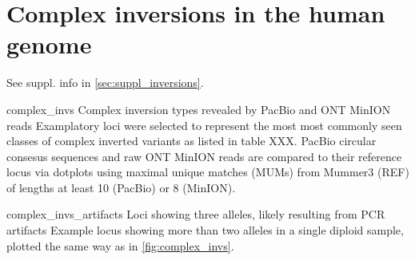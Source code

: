 \chapter{Complex inversions in the human genome}
\label{sec:inversions}

See suppl. info in \cref{sec:suppl_inversions}.

    {complex_invs}
    {Complex inversion types revealed by PacBio and ONT MinION reads}
    {Examplatory loci were selected to represent the most most commonly seen
    classes of complex inverted variants as listed in table XXX. PacBio circular
    consesus sequences and raw ONT MinION reads are compared to their reference
    locus via dotplots using maximal unique matches (MUMs) from Mummer3 (REF) of
    lengths at least 10 (PacBio) or 8 (MinION).}

    {complex_invs_artifacts}
    {Loci showing three alleles, likely resulting from PCR artifacts}
    {Example locus showing more than two alleles in a single diploid sample,
    plotted the same way as in \cref{fig:complex_invs}.}
